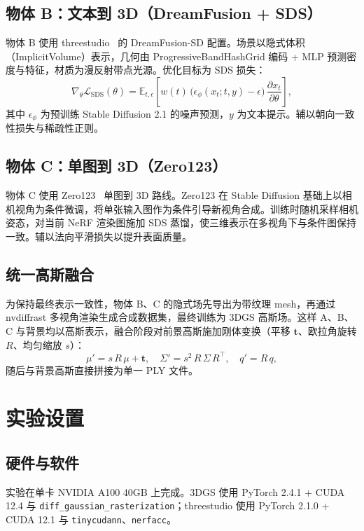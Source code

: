 \documentclass{article}
\begin{document}
\subsection{物体 B：文本到 3D（DreamFusion + SDS）}
物体 B 使用 threestudio~\cite{threestudio2023} 的 DreamFusion-SD 配置。场景以隐式体积（ImplicitVolume）表示，几何由 ProgressiveBandHashGrid 编码 + MLP 预测密度与特征，材质为漫反射带点光源。优化目标为 SDS 损失：
\begin{equation}
  \nabla_\theta \mathcal{L}_{\text{SDS}}(\theta) = \mathbb{E}_{t,\epsilon}\left[ w(t)\,\big(\epsilon_\phi(x_t;t,y) - \epsilon\big)\,\frac{\partial x_t}{\partial \theta} \right],
\end{equation}
其中 $\epsilon_\phi$ 为预训练 Stable Diffusion 2.1 的噪声预测，$y$ 为文本提示。辅以朝向一致性损失与稀疏性正则。

\subsection{物体 C：单图到 3D（Zero123）}
物体 C 使用 Zero123~\cite{zero1232023} 单图到 3D 路线。Zero123 在 Stable Diffusion 基础上以相机视角为条件微调，将单张输入图作为条件引导新视角合成。训练时随机采样相机姿态，对当前 NeRF 渲染图施加 SDS 蒸馏，使三维表示在多视角下与条件图保持一致。辅以法向平滑损失以提升表面质量。

\subsection{统一高斯融合}
为保持最终表示一致性，物体 B、C 的隐式场先导出为带纹理 mesh，再通过 nvdiffrast 多视角渲染生成合成数据集，最终训练为 3DGS 高斯场。这样 A、B、C 与背景均以高斯表示，融合阶段对前景高斯施加刚体变换（平移 $\mathbf{t}$、欧拉角旋转 $R$、均匀缩放 $s$）：
\begin{equation}
  \mu' = s\,R\,\mu + \mathbf{t},\quad
  \Sigma' = s^2\,R\,\Sigma\,R^\top,\quad
  q' = R\,q,
\end{equation}
随后与背景高斯直接拼接为单一 PLY 文件。

\section{实验设置}

\subsection{硬件与软件}
实验在单卡 NVIDIA A100 40GB 上完成。3DGS 使用 PyTorch 2.4.1 + CUDA 12.4 与 \texttt{diff\_gaussian\_rasterization}；threestudio 使用 PyTorch 2.1.0 + CUDA 12.1 与 \texttt{tinycudann}、\texttt{nerfacc}。
\end{document}
